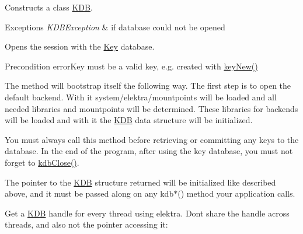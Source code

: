 Constructs a class \mbox{\hyperlink{classkdb_1_1KDB}{K\+DB}}. 


\begin{DoxyExceptions}{Exceptions}
{\em K\+D\+B\+Exception} & if database could not be opened\\
\hline
\end{DoxyExceptions}
Opens the session with the \mbox{\hyperlink{classkdb_1_1Key}{Key}} database. \begin{DoxyPrecond}{Precondition}
error\+Key must be a valid key, e.\+g. created with \mbox{\hyperlink{group__key_gad23c65b44bf48d773759e1f9a4d43b89}{key\+New()}}
\end{DoxyPrecond}
The method will bootstrap itself the following way. The first step is to open the default backend. With it system/elektra/mountpoints will be loaded and all needed libraries and mountpoints will be determined. These libraries for backends will be loaded and with it the {\ttfamily \mbox{\hyperlink{classkdb_1_1KDB}{K\+DB}}} data structure will be initialized.

You must always call this method before retrieving or committing any keys to the database. In the end of the program, after using the key database, you must not forget to \mbox{\hyperlink{group__kdb_gadb54dc9fda17ee07deb9444df745c96f}{kdb\+Close()}}.

The pointer to the {\ttfamily \mbox{\hyperlink{classkdb_1_1KDB}{K\+DB}}} structure returned will be initialized like described above, and it must be passed along on any kdb$\ast$() method your application calls.

Get a {\ttfamily \mbox{\hyperlink{classkdb_1_1KDB}{K\+DB}}} handle for every thread using elektra. Don\textquotesingle{}t share the handle across threads, and also not the pointer accessing it\+:


